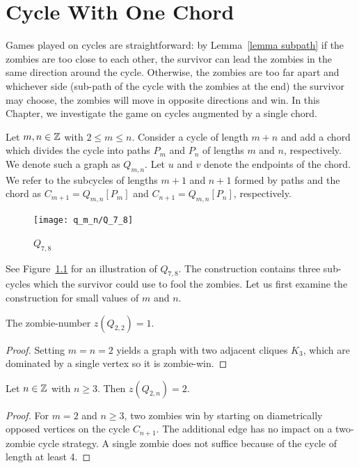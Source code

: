 \chapter{Cycle With One Chord}\label{chapter q_m_n}

Games played on cycles are straightforward: by Lemma~\ref{lemma subpath} if the zombies are too close to each other, the survivor can lead the zombies in the same direction around the cycle. Otherwise, the zombies are too far apart and whichever side (sub-path of the cycle with the zombies at the end) the survivor may choose, the zombies will move in opposite directions and win. In this Chapter, we investigate the game on cycles augmented by a single chord.

\begin{definition}
 Let $m, n \in \mathbb{Z}$ with $2\leq m \leq n$. Consider a cycle of length $m+n$ and add a chord which
 divides the cycle into paths $P_m$ and $P_n$ of lengths $m$ and $n$, respectively.
 We denote such a graph as $Q_{m,n}$. Let $u$ and $v$ denote the endpoints of the chord. We refer to the subcycles of lengths $m+1$ and $n+1$ formed by paths and the chord as $C_{m+1} = Q_{m,n}[P_m]$ and $C_{n+1} = Q_{m,n}[P_n]$, respectively.
\end{definition}

\begin{figure}
  \centering
 \texttt{[image: q\_m\_n/Q\_7\_8]}
 \caption{$Q_{7,8}$ \label{fig:Q_7_8}}
\end{figure}

See Figure~\ref{fig:Q_7_8} for an illustration of $Q_{7,8}$.
The construction contains three sub-cycles which the survivor could use to fool the zombies.
Let us first examine the construction for small values of $m$ and $n$.

 \begin{lemma}
The zombie-number $z(Q_{2,2}) = 1$.
 \end{lemma}
\begin{proof}
  Setting $m=n=2$ yields a graph with two adjacent cliques $K_3$, which are dominated by a single vertex so it is zombie-win.
\end{proof}

\begin{lemma}
  Let $n \in \mathbb{Z}$ with $n \geq 3$. Then $z(Q_{2,n}) = 2$.
\end{lemma}
\begin{proof}
  For $m=2$ and $n\geq 3$, two zombies win by starting on diametrically
  opposed vertices on the cycle $C_{n+1}$. The additional edge has no impact on a two-zombie cycle strategy. A single zombie does not suffice because of the cycle of length at least 4.
\end{proof}

